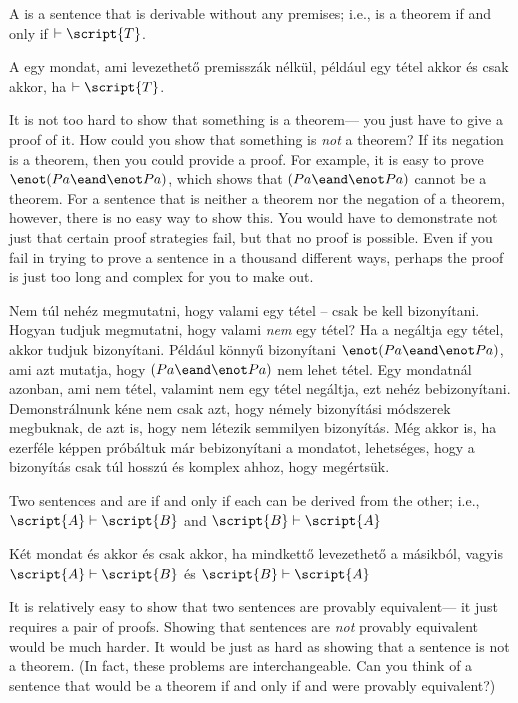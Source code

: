 A  is a sentence that is derivable without any premises; i.e.,  is a theorem if and only if $\vdash\script{T}$.

A  egy mondat, ami levezethető premisszák nélkül, például  egy tétel akkor és csak akkor, ha $\vdash\script{T}$.

It is not too hard to show that something is a theorem--- you just have to give a proof of it. How could you show that something is \emph{not} a theorem? If its negation is a theorem, then you could provide a proof. For example, it is easy to prove $\enot(Pa \eand \enot Pa)$, which shows that $(Pa \eand \enot Pa)$ cannot be a theorem. For a sentence that is neither a theorem nor the negation of a theorem, however, there is no easy way to show this. You would have to demonstrate not just that certain proof strategies fail, but that no proof is possible. Even if you fail in trying to prove a sentence in a thousand different ways, perhaps the proof is just too long and complex for you to make out.

Nem túl nehéz megmutatni, hogy valami egy tétel -- csak be kell bizonyítani. Hogyan tudjuk megmutatni, hogy valami \emph{nem} egy tétel? Ha a negáltja egy tétel, akkor tudjuk bizonyítani. Például könnyű bizonyítani $\enot(Pa \eand \enot Pa)$, ami azt mutatja, hogy $(Pa \eand \enot Pa)$ nem lehet tétel. Egy mondatnál azonban, ami nem tétel, valamint nem egy tétel negáltja, ezt nehéz bebizonyítani. Demonstrálnunk kéne nem csak azt, hogy némely bizonyítási módszerek megbuknak, de azt is, hogy nem létezik semmilyen bizonyítás. Még akkor is, ha ezerféle képpen próbáltuk már bebizonyítani a mondatot, lehetséges, hogy a bizonyítás csak túl hosszú és komplex ahhoz, hogy megértsük.

Two sentences  and  are  if and only if each can be derived from the other; i.e., $\script{A}\vdash\script{B}$ and $\script{B}\vdash\script{A}$

Két mondat  és   akkor és csak akkor, ha mindkettő levezethető a másikból, vagyis $\script{A}\vdash\script{B}$ és $\script{B}\vdash\script{A}$

It is relatively easy to show that two sentences are provably equivalent--- it just requires a pair of proofs. Showing that sentences are \emph{not} provably equivalent would be much harder. It would be just as hard as showing that a sentence is not a theorem. (In fact, these problems are interchangeable. Can you think of a sentence that would be a theorem if and only if  and  were provably equivalent?)

